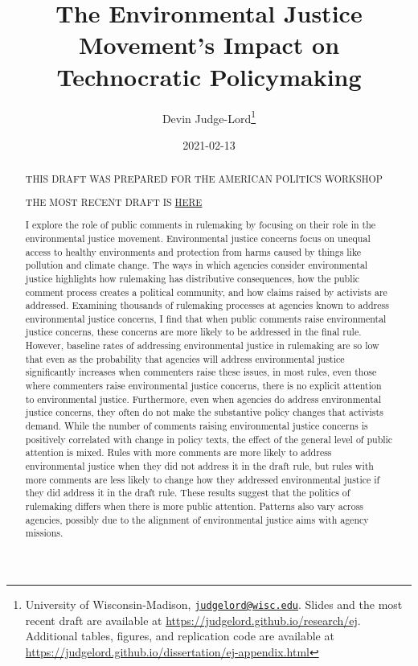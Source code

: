 \documentclass[
      12pt,
        ]{article}
\title{The Environmental Justice Movement's Impact on Technocratic Policymaking}
\author{ %
            Devin Judge-Lord\footnote{University of Wisconsin-Madison, \href{mailto:judgelord@wisc.edu}{\nolinkurl{judgelord@wisc.edu}}. Slides and the most recent draft are available at \url{https://judgelord.github.io/research/ej}. Additional tables, figures, and replication code are available at \url{https://judgelord.github.io/dissertation/ej-appendix.html}} 
            }
\date{2021-02-13}
\begin{document}
 


  \maketitle




  \begin{abstract}
    \noindent THIS DRAFT WAS PREPARED FOR THE AMERICAN POLITICS WORKSHOP

THE MOST RECENT DRAFT IS \href{https://judgelord.github.io/research/ej/}{HERE}

\bigskip

I explore the role of public comments in rulemaking by focusing on their role in the environmental justice movement. Environmental justice concerns focus on unequal access to healthy environments and protection from harms caused by things like pollution and climate change. The ways in which agencies consider environmental justice highlights how rulemaking has distributive consequences, how the public comment process creates a political community, and how claims raised by activists are addressed. Examining thousands of rulemaking processes at agencies known to address environmental justice concerns, I find that when public comments raise environmental justice concerns, these concerns are more likely to be addressed in the final rule. However, baseline rates of addressing environmental justice in rulemaking are so low that even as the probability that agencies will address environmental justice significantly increases when commenters raise these issues, in most rules, even those where commenters raise environmental justice concerns, there is no explicit attention to environmental justice. Furthermore, even when agencies do address environmental justice concerns, they often do not make the substantive policy changes that activists demand. While the number of comments raising environmental justice concerns is positively correlated with change in policy texts, the effect of the general level of public attention is mixed. Rules with more comments are more likely to address environmental justice when they did not address it in the draft rule, but rules with more comments are less likely to change how they addressed environmental justice if they did address it in the draft rule. These results suggest that the politics of rulemaking differs when there is more public attention. Patterns also vary across agencies, possibly due to the alignment of environmental justice aims with agency missions. 

    

  \end{abstract}
\end{document}
